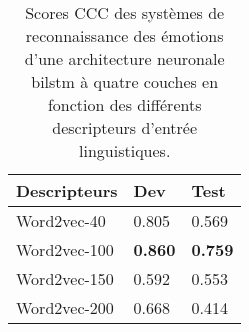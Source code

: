 \begin{table}[h]
  \centering
  \begin{tabular}{|l|l|l|}
  \hline
  Descripteurs   &Dev   &Test  \\
  \hline
  Word2vec-40    &0.805 &0.569 \\
  Word2vec-100   &\textbf{0.860} &\textbf{0.759} \\
  Word2vec-150   &0.592 &0.553 \\
  Word2vec-200   &0.668 &0.414 \\
  \hline
\end{tabular}
\caption{Scores CCC des systèmes de reconnaissance des émotions d'une architecture neuronale bilstm à quatre couches en fonction des différents descripteurs d'entrée linguistiques.}
\label{tab:res_word2vec}
\end{table}
